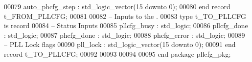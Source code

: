 \begin{DoxyCode}
00079       \textcolor{vhdlchar}{auto_phcfg_step}   \textcolor{vhdlchar}{:} \textcolor{comment}{std\_logic\_vector}\textcolor{vhdlchar}{(}\textcolor{vhdllogic}{}\textcolor{vhdllogic}{15} \textcolor{keywordflow}{downto} \textcolor{vhdllogic}{}\textcolor{vhdllogic}{0}\textcolor{vhdlchar}{)};
00080    \textcolor{keywordflow}{end} \textcolor{keywordflow}{record} \textcolor{vhdlchar}{t_FROM_PLLCFG};
00081   
00082 \textcolor{keyword}{   -- Inputs to the .}
00083    \textcolor{keywordflow}{type} \textcolor{vhdlchar}{t_TO_PLLCFG} \textcolor{keywordflow}{is} \textcolor{keywordflow}{record}
00084 \textcolor{keyword}{      -- Status Inputs}
00085       \textcolor{vhdlchar}{pllcfg_busy}    \textcolor{vhdlchar}{:} \textcolor{comment}{std\_logic};
00086       \textcolor{vhdlchar}{pllcfg_done}    \textcolor{vhdlchar}{:} \textcolor{comment}{std\_logic};
00087       \textcolor{vhdlchar}{phcfg_done}     \textcolor{vhdlchar}{:} \textcolor{comment}{std\_logic};
00088       \textcolor{vhdlchar}{phcfg_error}    \textcolor{vhdlchar}{:} \textcolor{comment}{std\_logic};
00089 \textcolor{keyword}{      -- PLL Lock flags}
00090       \textcolor{vhdlchar}{pll_lock}       \textcolor{vhdlchar}{:} \textcolor{comment}{std\_logic\_vector}\textcolor{vhdlchar}{(}\textcolor{vhdllogic}{}\textcolor{vhdllogic}{15} \textcolor{keywordflow}{downto} \textcolor{vhdllogic}{}\textcolor{vhdllogic}{0}\textcolor{vhdlchar}{)};
00091    \textcolor{keywordflow}{end} \textcolor{keywordflow}{record} \textcolor{vhdlchar}{t_TO_PLLCFG};
00092    
00093 
00094       
00095 \textcolor{keywordflow}{end} \textcolor{keywordflow}{package} \textcolor{vhdlchar}{pllcfg\_pkg};
\end{DoxyCode}
